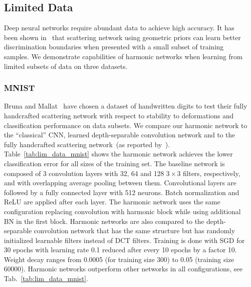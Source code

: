 \documentclass[conference]{IEEEtran}
\begin{document}
\subsection{Limited Data} \label{sec:exp/lim_data}

Deep neural networks require abundant data to achieve high accuracy. It has been shown in~\cite{Bruna13,Oyallon18} that  scattering network using geometric priors can learn better discrimination boundaries when presented with a small subset of training samples. We demonstrate capabilities of harmonic networks when learning from limited subsets of data on three datasets.

\subsubsection{MNIST} \label{sec:lim_data/mnist}
Bruna and Mallat~\cite{Bruna13}  have chosen a dataset of handwritten digits to test their fully handcrafted scattering network with respect to stability to deformations and classification performance on data subsets. We compare our harmonic network to the ``classical'' CNN, learned depth-separable convolution network and to the fully handcrafted scattering network~(as reported by~\cite{Bruna13}).
Table~\ref{tab:lim_data_mnist} shows the harmonic network achieves the lower classification error for all sizes of the training set. The baseline network is composed of 3 convolution layers with 32, 64 and 128 $3 \times 3$ filters, respectively, and with overlapping average pooling between them. Convolutional layers are followed by a fully connected layer with 512 neurons. Batch normalization and ReLU are applied after each layer. The harmonic network uses the same configuration replacing convolution with harmonic block while using additional BN in the first block. Harmonic networks are also compared to the depth-separable convolution network that has the same structure but has randomly initialized learnable filters instead of DCT filters. Training is done with SGD for 30 epochs with learning rate 0.1 reduced after every 10 epochs by a factor 10. Weight decay ranges from 0.0005 (for training size 300) to 0.05 (training size 60000). Harmonic networks outperform other networks in all configurations, see Tab.~\ref{tab:lim_data_mnist}.  
\end{document}

